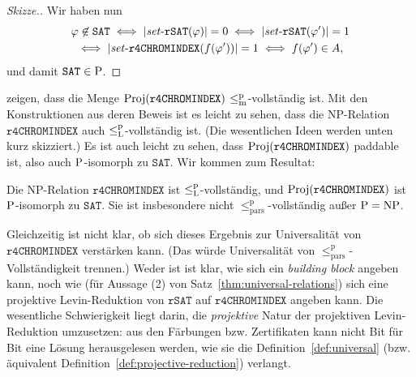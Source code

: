 \begin{proof}[Skizze.]
    Wir haben nun
    \begin{gather*} \phi\not\in\mathtt{SAT} \iff |\fset{}\mathtt{rSAT}(\phi)|=0 \iff |\fset{}\mathtt{rSAT}(\phi')|=1 \\ \iff |\fset{}\mathtt{r4CHROMINDEX}(f(\phi'))|=1 \iff f(\phi') \in A, \end{gather*}
    und damit $\mathtt{SAT}\in\P$.
\end{proof}

\textcite{leven_np_1983} zeigen, dass die Menge $\Proj(\mathtt{r4CHROMINDEX})$ $\leqmp$-vollständig ist. 
Mit den Konstruktionen aus deren Beweis ist es leicht zu sehen, dass die NP-Relation $\mathtt{r4CHROMINDEX}$ auch $\leqlp$-vollständig ist. (Die wesentlichen Ideen werden unten kurz skizziert.)
Es ist auch leicht zu sehen, dass $\Proj(\mathtt{r4CHROMINDEX})$ paddable ist, also  auch $\P$-isomorph zu $\mathtt{SAT}$.
Wir kommen zum Resultat:
\begin{observation}
    Die NP-Relation $\mathtt{r4CHROMINDEX}$ ist $\leqlp$-vollständig, und $\Proj(\mathtt{r4CHROMINDEX})$ ist $\P$-isomorph zu $\mathtt{SAT}$.
    Sie ist insbesondere nicht $\leq_\mathrm{pars}^\mathrm p$-vollständig außer $\P=\NP$.
\end{observation}

Gleichzeitig ist nicht klar, ob sich dieses Ergebnis zur Universalität von $\mathtt{r4CHROMINDEX}$ verstärken kann. (Das würde Universalität von $\leq_\mathrm{pars}^\mathrm p$-Vollständigkeit trennen.) Weder ist ist klar, wie sich ein \emph{building block} angeben kann, noch wie (für Aussage (2) von Satz~\ref{thm:universal-relations}) sich eine projektive Levin-Reduktion von $\mathtt{rSAT}$ auf $\mathtt{r4CHROMINDEX}$ angeben kann. Die wesentliche Schwierigkeit liegt darin, die \emph{projektive} Natur der projektiven Levin-Reduktion umzusetzen: aus den Färbungen bzw. Zertifikaten kann nicht Bit für Bit eine Lösung herausgelesen werden, wie sie die Definition~\ref{def:universal} (bzw. äquivalent Definition~\ref{def:projective-reduction}) verlangt.

